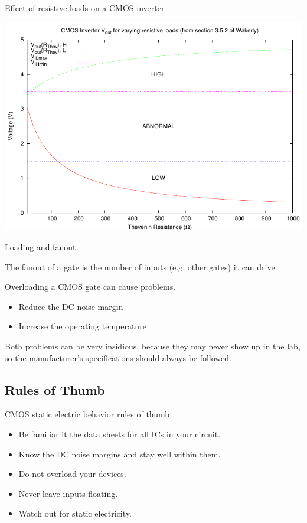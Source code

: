 \begin{frame}{Effect of resistive loads on a CMOS inverter}
  \begin{center}
    \includegraphics[scale=0.8]{ResistiveLoadsGraph}
  \end{center}
\end{frame}

\begin{frame}{Loading and fanout}
  \begin{definition}
    The \alert{fanout} of a gate is the number of inputs (e.g. other gates) it can drive.
  \end{definition}
  Overloading a CMOS gate can cause problems.
  \begin{itemize}
    \item Reduce the DC noise margin
    \item Increase the operating temperature
  \end{itemize}
\end{frame}

Both problems can be very insidious, because they may never show up in the lab, so the manufacturer's specifications should always be followed.

\subsection{Rules of Thumb}

\begin{frame}{CMOS static electric behavior rules of thumb}
  \begin{itemize}
    \item Be familiar it the data sheets for all ICs in your circuit.
    \item Know the DC noise margins and stay well within them.
    \item Do not overload your devices.
    \item Never leave inputs floating.
    \item Watch out for static electricity.
  \end{itemize}
\end{frame}

